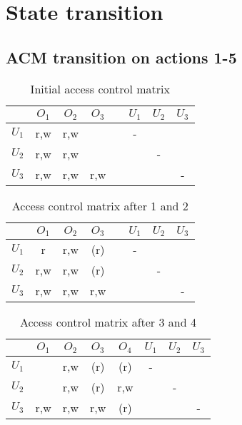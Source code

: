 




\newcommand{\nr}{1}
\setcounter{section}{0}



\section{State transition}

\subsection*{ACM transition on actions 1-5}

\begin{table}[h]
\caption{Initial access control matrix}
\begin{center}
\begin{tabular}{l|c|c|c|c|c|c|c|}
       & $O_1$ & $O_2$ & $O_3$ &       & $U_1$ & $U_2$ & $U_3$ \\ \hline
 $U_1$ &  r,w  &  r,w  &       &       &   -   &       &       \\ \hline
 $U_2$ &  r,w  &  r,w  &       &       &       &   -   &       \\ \hline
 $U_3$ &  r,w  &  r,w  &  r,w  &       &       &       &   -   \\ \hline
\end{tabular}
\end{center}
\end{table}
\begin{table}[h]
\caption{Access control matrix after 1 and 2}
\begin{center}
\begin{tabular}{l|c|c|c|c|c|c|c|}
       & $O_1$ & $O_2$ & $O_3$ &       & $U_1$ & $U_2$ & $U_3$ \\ \hline
 $U_1$ &  r    &  r,w  &  (r)  &       &   -   &       &       \\ \hline
 $U_2$ &  r,w  &  r,w  &  (r)  &       &       &   -   &       \\ \hline
 $U_3$ &  r,w  &  r,w  &  r,w  &       &       &       &   -   \\ \hline
\end{tabular}
\end{center}
\end{table}
\begin{table}[h]
\caption{Access control matrix after 3 and 4}
\begin{center}
\begin{tabular}{l|c|c|c|c|c|c|c|}
       & $O_1$ & $O_2$ & $O_3$ & $O_4$ & $U_1$ & $U_2$ & $U_3$ \\ \hline
 $U_1$ &       &  r,w  &  (r)  &  (r)  &   -   &       &       \\ \hline
 $U_2$ &       &  r,w  &  (r)  &  r,w  &       &   -   &       \\ \hline
 $U_3$ &  r,w  &  r,w  &  r,w  &  (r)  &       &       &   -   \\ \hline
\end{tabular}
\end{center}
\end{table}

